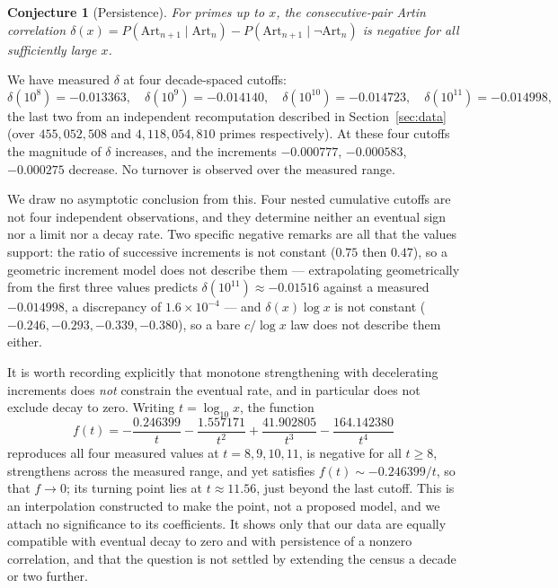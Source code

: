 \documentclass[11pt]{amsart}
\newtheorem{conjecture}{Conjecture}
\theoremstyle{definition}
\newcommand{\Art}{\mathrm{Art}}
\begin{document}
\begin{conjecture}[Persistence]
	\label{conj:persist}
	For primes up to $x$, the consecutive-pair Artin correlation
	$\delta(x) = P(\Art_{n+1} \mid \Art_n) - P(\Art_{n+1} \mid \lnot\Art_n)$
	is negative for all sufficiently large $x$.
\end{conjecture}

We have measured $\delta$ at four decade-spaced cutoffs:
\[
  \delta(10^8) = -0.013363, \quad
  \delta(10^9) = -0.014140, \quad
  \delta(10^{10}) = -0.014723, \quad
  \delta(10^{11}) = -0.014998 ,
\]
the last two from an independent recomputation described in
Section~\ref{sec:data} (over $455{,}052{,}508$ and $4{,}118{,}054{,}810$
primes respectively). At these four cutoffs the magnitude of $\delta$
increases, and the increments $-0.000777$, $-0.000583$, $-0.000275$ decrease.
No turnover is observed over the measured range.

We draw no asymptotic conclusion from this. Four nested cumulative cutoffs are
not four independent observations, and they determine neither an eventual sign
nor a limit nor a decay rate. Two specific negative remarks are all that the
values support: the ratio of successive increments is not constant ($0.75$
then $0.47$), so a geometric increment model does not describe them ---
extrapolating geometrically from the first three values predicts
$\delta(10^{11}) \approx -0.01516$ against a measured $-0.014998$, a
discrepancy of $1.6 \times 10^{-4}$ --- and $\delta(x)\log x$ is not constant
($-0.246, -0.293, -0.339, -0.380$), so a bare $c/\log x$ law does not describe
them either.

It is worth recording explicitly that monotone strengthening with decelerating
increments does \emph{not} constrain the eventual rate, and in particular does
not exclude decay to zero. Writing $t = \log_{10} x$, the function
\[
  f(t) = -\frac{0.246399}{t} - \frac{1.557171}{t^2}
         + \frac{41.902805}{t^3} - \frac{164.142380}{t^4}
\]
reproduces all four measured values at $t = 8, 9, 10, 11$, is negative for all
$t \ge 8$, strengthens across the measured range, and yet satisfies
$f(t) \sim -0.246399/t$, so that $f \to 0$; its turning point lies at
$t \approx 11.56$, just beyond the last cutoff. This is an interpolation
constructed to make the point, not a proposed model, and we attach no
significance to its coefficients. It shows only that our data are equally
compatible with eventual decay to zero and with persistence of a nonzero
correlation, and that the question is not settled by extending the census a
decade or two further.
\end{document}
